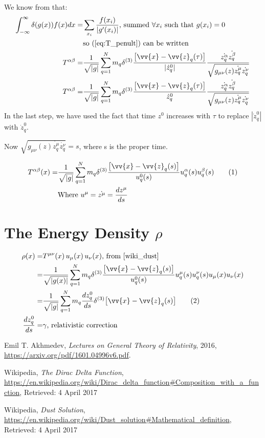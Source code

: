 \documentclass[]{article}
\newcommand\numberthis{\addtocounter{equation}{1}\tag{\theequation}}
\begin{document}
We know from \cite{wiki_delta} that:
\begin{align*}
\int_{-\infty}^{\infty} \delta(g(x)) f(x) dx  =& \sum_{x_i} \frac{f(x_i)}{|g'(x_i)|} \text{, summed $ \forall x_i$ such that $g(x_i)=0$}\\
&\text{so (\ref{eq:T_penult}) can be written}\\
 T^{\alpha\beta} =& \frac{1}{\sqrt{|g|}} \sum_{q=1}^{N} m_q  \delta^{(3)} \frac{\big[\vv{x}-\vv{z}_q(\tau)\big]}{|\dot{z}_q^0|}\frac{\dot{z_q^\alpha}  \dot{z_q^\beta}}{\sqrt{g_{\mu\nu}(z)\dot{z_q^\mu}\dot{z_q^\nu}}} \\
 T^{\alpha\beta} =& \frac{1}{\sqrt{|g|}} \sum_{q=1}^{N} m_q  \delta^{(3)} \frac{\big[\vv{x}-\vv{z}_q(\tau)\big]}{\dot{z}_q^0}\frac{\dot{z_q^\alpha}  \dot{z_q^\beta}}{\sqrt{g_{\mu\nu}(z)\dot{z_q^\mu}\dot{z_q^\nu}}}
\end{align*}
In the last step, we have used the fact that time $z^0$ increases with $\tau$ to replace $|\dot{z}_q^0|$ with $\dot{z}_q^0$.


Now $\sqrt{g_{\mu\nu}(z)\dot{z_q^\mu}\dot{z_q^\nu}}=s$, where s is the proper time.

\begin{align*}
T^{\alpha\beta}(x) =& \frac{1}{\sqrt{|g|}} \sum_{q=1}^{N} m_q \delta^{(3)} \frac{\big[\vv{x}-\vv{z}_q(s)\big]}{u_q^0 (s)} u_q^\alpha (s) u_q^\beta (s)  \numberthis \label{eq:T}\\
&\text{Where $u^{\mu} = \dot{z^\mu} = \frac{d z^\mu}{d s}$}
\end{align*}





\section{The Energy Density $\rho$}

\begin{align*}
\rho(x) =& T^{\mu\nu}(x) \, u_\mu(x) \, u_\nu(x) \text{, from \cite{wiki_dust}}\\
=& \frac{1}{\sqrt{|g(x)|}} \sum_{q=1}^{N} m_q \delta^{(3)} \frac{\big[\vv{x}-\vv{z}_q(s)\big]}{u_q^0 (s)} u_q^\mu (s) u_q^\nu (s) u_\mu(x) u_\nu(x)\\
=&\frac{1}{\sqrt{|g|}} \sum_{q=1}^{N} m_q \frac{d z^0_q}{d s} \delta^{(3)} \big[\vv{x}-\vv{z}_q(s)\big] \numberthis \label{eq:density} \\
\frac{d z^0_q}{d s}=&\gamma \text{, relativistic correction}
\end{align*}


\begin{thebibliography}{9}
	
	Emil T. Akhmedev,
	\emph{Lectures on General Theory of Relativity},
	2016,
	\url{https://arxiv.org/pdf/1601.04996v6.pdf}.
	
	Wikipedia,
	\emph{The Dirac Delta Function},
	\url{https://en.wikipedia.org/wiki/Dirac_delta_function#Composition_with_a_function},
	Retrieved: 4 April 2017
	
	Wikipedia,
	\emph{Dust Solution},
	\url{https://en.wikipedia.org/wiki/Dust_solution#Mathematical_definition},
	Retrieved: 4 April 2017
\end{thebibliography}
\end{document}
